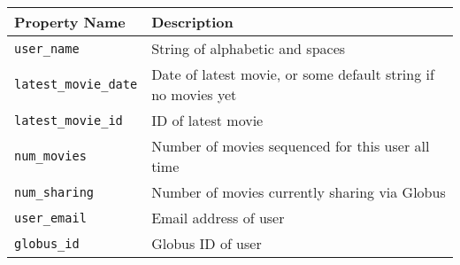 \begin{tabularx}{\textwidth}{l|X}
\hline
 Property Name     & Description                                                   \\
\hline
 \texttt{user\_name}         & String of alphabetic and spaces                               \\
 \texttt{latest\_movie\_date} & Date of latest movie, or some default string if no movies yet \\
 \texttt{latest\_movie\_id}   & ID of latest movie                                            \\
 \texttt{num\_movies}        & Number of movies sequenced for this user all time             \\
 \texttt{num\_sharing}       & Number of movies currently sharing via Globus                 \\
 \texttt{user\_email}        & Email address of user                                         \\
 \texttt{globus\_id}         & Globus ID of user                                             \\
\hline
\end{tabularx}